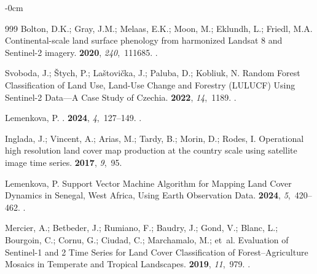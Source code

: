 \documentclass[coasts,article,accept,pdftex,moreauthors]{Definitions/mdpi}
\begin{document}
\begin{adjustwidth}{-\extralength}{0cm}
\begin{thebibliography}{999}
Bolton, D.K.; Gray, J.M.; Melaas, E.K.; Moon, M.; Eklundh, L.; Friedl, M.A.
\newblock Continental-scale land surface phenology from harmonized {Landsat 8}
  and {Sentinel-2} imagery.
 {\bf 2020}, {\em 240},~111685.
.

Svoboda, J.; {\v S}tych, P.; La{\v s}tovi{\v c}ka, J.; Paluba, D.; Kobliuk, N.
\newblock Random Forest Classification of Land Use, Land-Use Change and
  Forestry ({LULUCF}) Using {Sentinel-2} Data---A Case Study of {Czechia}.
 {\bf 2022}, {\em 14},~1189.
.

Lemenkova, P.
.
 {\bf 2024}, {\em 4},~127--149.
.

Inglada, J.; Vincent, A.;  Arias, M.; Tardy, B.; Morin, D.; Rodes, I. 
\newblock Operational high resolution land cover map production at the country
  scale using satellite image time series.
 {\bf 2017}, {\em 9},~95.

Lemenkova, P.
\newblock Support Vector Machine Algorithm for Mapping Land Cover Dynamics in
  Senegal, West Africa, Using Earth Observation Data.
 {\bf 2024}, {\em 5},~420--462.
.

Mercier, A.; Betbeder, J.; Rumiano, F.; Baudry, J.; Gond, V.; Blanc, L.;
  Bourgoin, C.; Cornu, G.; Ciudad, C.; Marchamalo, M.;  et~al.
\newblock Evaluation of Sentinel-1 and 2 Time Series for Land Cover
  Classification of Forest–Agriculture Mosaics in Temperate and Tropical
  Landscapes.
 {\bf 2019}, {\em 11},~979.
.


\end{thebibliography}
\end{adjustwidth}
\end{document}
